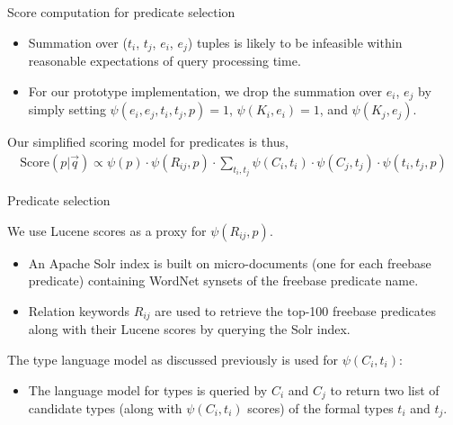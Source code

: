 \documentclass[pdf,11pt]{beamer}
\begin{document}
\begin{frame}{Score computation for predicate selection}

\begin{itemize}
\item Summation over ($t_i$, $t_j$, $e_i$, $e_j$) tuples is likely to be infeasible within reasonable expectations of query processing time.
\item For our prototype implementation, we drop the summation over $e_i$, $e_j$ by simply setting $\psi(e_i,e_j,t_i,	t_j,p) = 1$, $\psi(K_i,e_i) = 1$, and $\psi(K_j,e_j)$.
\end{itemize}

Our simplified scoring model for predicates is thus,
\begin{align}
\text{Score}(p|\vec{q}) \propto \psi(p) \cdot \psi(R_{ij},p) \cdot \sum_{t_i,t_j} \psi(C_i,t_i) \cdot \psi(C_j,t_j) \cdot \psi(t_i,t_j,p) \nonumber
\end{align}

\end{frame}

\begin{frame}{Predicate selection}

We use Lucene scores as a proxy for $\psi(R_{ij}, p)$.
\begin{itemize}
\item An Apache Solr index is built on micro-documents (one for each freebase predicate) containing WordNet synsets of the freebase predicate name.
\item Relation keywords $R_{ij}$ are used to retrieve the top-100 freebase predicates along with their Lucene scores by querying the Solr index.
\end{itemize}


The type language model as discussed previously is used for $\psi(C_i,t_i)$:
\begin{itemize}
\item The language model for types is queried by $C_i$ and $C_j$ to return two list of candidate types (along with $\psi(C_i,t_i)$ scores) of the formal types $t_i$ and $t_j$.

\end{itemize}

\end{frame}
\end{document}
